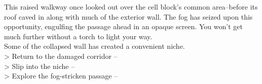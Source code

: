 This raised walkway once looked out over the cell block’s common area--before its roof caved in along with much of the exterior wall. The fog has seized upon this opportunity, engulfing the passage ahead in an opaque screen. You won’t get much further without a torch to light your way.\\

Some of the collapsed wall has created a convenient niche.\\

> Return to the damaged corridor -- \\
> Slip into the niche -- \\
> Explore the fog-stricken passage -- 